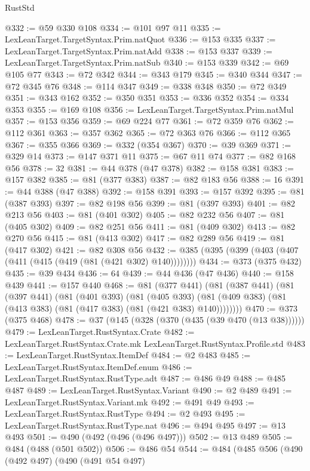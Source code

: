 \begin{lexlean}{RustStd}
\begin{coremodule}
@332 := @59 @330 @108
@334 := @101 @97 @11
@335 := LexLeanTarget.TargetSyntax.Prim.natQuot
@336 := @153 @335
@337 := LexLeanTarget.TargetSyntax.Prim.natAdd
@338 := @153 @337
@339 := LexLeanTarget.TargetSyntax.Prim.natSub
@340 := @153 @339
@342 := @69 @105 @77
@343 := @72 @342
@344 := @343 @179
@345 := @340 @344
@347 := @72 @345 @76
@348 := @114 @347
@349 := @338 @348
@350 := @72 @349
@351 := @343 @162
@352 := @350 @351
@353 := @336 @352
@354 := @334 @353
@355 := @169 @108
@356 := LexLeanTarget.TargetSyntax.Prim.natMul
@357 := @153 @356
@359 := @69 @224 @77
@361 := @72 @359 @76
@362 := @112 @361
@363 := @357 @362
@365 := @72 @363 @76
@366 := @112 @365
@367 := @355 @366
@369 := @332 (@354 @367)
@370 := @39 @369
@371 := @329 @14
@373 := @147 @371 @11
@375 := @67 @11 @74
@377 := @82 @168 @56
@378 := 32
@381 := @44 @378 (@47 @378)
@382 := @158 @381
@383 := @157 @382
@385 := @81 (@377 @383)
@387 := @82 @183 @56
@388 := 16
@391 := @44 @388 (@47 @388)
@392 := @158 @391
@393 := @157 @392
@395 := @81 (@387 @393)
@397 := @82 @198 @56
@399 := @81 (@397 @393)
@401 := @82 @213 @56
@403 := @81 (@401 @302)
@405 := @82 @232 @56
@407 := @81 (@405 @302)
@409 := @82 @251 @56
@411 := @81 (@409 @302)
@413 := @82 @270 @56
@415 := @81 (@413 @302)
@417 := @82 @289 @56
@419 := @81 (@417 @302)
@421 := @82 @308 @56
@432 := @385 (@395 (@399 (@403 (@407 (@411 (@415 (@419 (@81 (@421 @302) @140))))))))
@434 := @373 (@375 @432)
@435 := @39 @434
@436 := 64
@439 := @44 @436 (@47 @436)
@440 := @158 @439
@441 := @157 @440
@468 := @81
    (@377 @441)
    (@81
      (@387 @441)
      (@81
        (@397 @441)
        (@81
          (@401 @393)
          (@81
            (@405 @393)
            (@81 (@409 @383) (@81 (@413 @383) (@81 (@417 @383) (@81 (@421 @383) @140))))))))
@470 := @373 (@375 @468)
@478 := @37 (@145 (@328 (@370 (@435 (@39 @470 (@13 @38))))))
@479 := LexLeanTarget.RustSyntax.Crate
@482 := LexLeanTarget.RustSyntax.Crate.mk LexLeanTarget.RustSyntax.Profile.std
@483 := LexLeanTarget.RustSyntax.ItemDef
@484 := @2 @483
@485 := LexLeanTarget.RustSyntax.ItemDef.enum
@486 := LexLeanTarget.RustSyntax.RustType.adt
@487 := @486 @49
@488 := @485 @487
@489 := LexLeanTarget.RustSyntax.Variant
@490 := @2 @489
@491 := LexLeanTarget.RustSyntax.Variant.mk
@492 := @491 @49
@493 := LexLeanTarget.RustSyntax.RustType
@494 := @2 @493
@495 := LexLeanTarget.RustSyntax.RustType.nat
@496 := @494 @495
@497 := @13 @493
@501 := @490 (@492 (@496 (@496 @497)))
@502 := @13 @489
@505 := @484 (@488 (@501 @502))
@506 := @486 @54
@544 := @484
    (@485
      @506
      (@490
        (@492 @497)
        (@490
          (@491 @54 @497)

\end{coremodule}
\end{lexlean}
